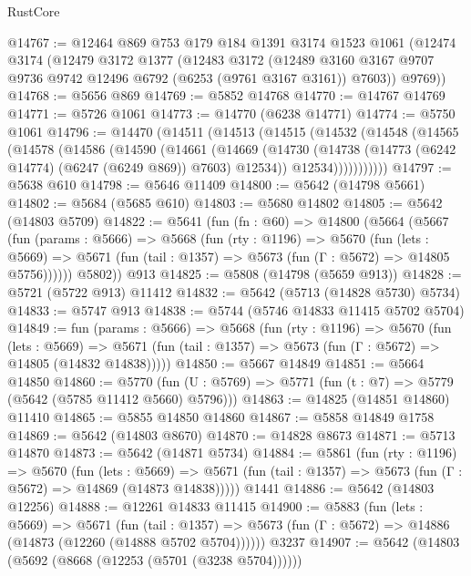 \begin{lexlean}{RustCore}
\begin{coremodule}
@14767 := @12464
    @869
    @753
    @179
    @184
    @1391
    @3174
    @1523
    @1061
    (@12474
      @3174
      (@12479
        @3172
        @1377
        (@12483
          @3172
          (@12489 @3160 @3167 @9707 @9736 @9742 @12496 @6792 (@6253 (@9761 @3167 @3161)) @7603))
        @9769))
@14768 := @5656 @869
@14769 := @5852 @14768
@14770 := @14767 @14769
@14771 := @5726 @1061
@14773 := @14770 (@6238 @14771)
@14774 := @5750 @1061
@14796 := @14470
    (@14511
      (@14513
        (@14515
          (@14532
            (@14548
              (@14565
                (@14578
                  (@14586
                    (@14590
                      (@14661
                        (@14669
                          (@14730
                            (@14738 (@14773 (@6242 @14774) (@6247 (@6249 @869)) @7603) @12534))
                          @12534)))))))))))
@14797 := @5638 @610
@14798 := @5646 @11409
@14800 := @5642 (@14798 @5661)
@14802 := @5684 (@5685 @610)
@14803 := @5680 @14802
@14805 := @5642 (@14803 @5709)
@14822 := @5641
    (fun (fn : @60) =>
    @14800
      (@5664
        (@5667
          (fun (params : @5666) =>
          @5668
            (fun (rty : @1196) =>
            @5670
              (fun (lets : @5669) =>
              @5671 (fun (tail : @1357) => @5673 (fun (Γ : @5672) => @14805 @5756))))))
        @5802))
    @913
@14825 := @5808 (@14798 (@5659 @913))
@14828 := @5721 (@5722 @913) @11412
@14832 := @5642 (@5713 (@14828 @5730) @5734)
@14833 := @5747 @913
@14838 := @5744 (@5746 @14833 @11415 @5702 @5704)
@14849 := fun (params : @5666) =>
  @5668
    (fun (rty : @1196) =>
    @5670
      (fun (lets : @5669) =>
      @5671 (fun (tail : @1357) => @5673 (fun (Γ : @5672) => @14805 (@14832 @14838)))))
@14850 := @5667 @14849
@14851 := @5664 @14850
@14860 := @5770
    (fun (U : @5769) => @5771 (fun (t : @7) => @5779 (@5642 (@5785 @11412 @5660) @5796)))
@14863 := @14825 (@14851 @14860) @11410
@14865 := @5855 @14850 @14860
@14867 := @5858 @14849 @1758
@14869 := @5642 (@14803 @8670)
@14870 := @14828 @8673
@14871 := @5713 @14870
@14873 := @5642 (@14871 @5734)
@14884 := @5861
    (fun (rty : @1196) =>
    @5670
      (fun (lets : @5669) =>
      @5671 (fun (tail : @1357) => @5673 (fun (Γ : @5672) => @14869 (@14873 @14838)))))
    @1441
@14886 := @5642 (@14803 @12256)
@14888 := @12261 @14833 @11415
@14900 := @5883
    (fun (lets : @5669) =>
    @5671
      (fun (tail : @1357) =>
      @5673 (fun (Γ : @5672) => @14886 (@14873 (@12260 (@14888 @5702 @5704))))))
    @3237
@14907 := @5642 (@14803 (@5692 (@8668 (@12253 (@5701 (@3238 @5704))))))

\end{coremodule}
\end{lexlean}
